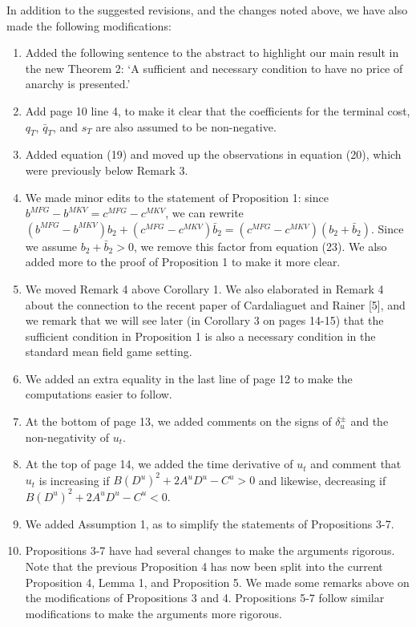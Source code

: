\documentclass[11pt]{article}
\begin{document}
\hspace{-7mm} In addition to the suggested revisions, and the changes noted above, we have also made the following modifications:
\begin{enumerate}
	\item Added the following sentence to the abstract to highlight our main result in the new Theorem 2: `A sufficient and necessary condition to have no price of anarchy is presented.'
	\item Add page 10 line 4, to make it clear that the coefficients for the terminal cost, $q_T$, $\bar{q}_T$, and $s_T$ are also assumed to be non-negative.
	\item Added equation (19) and moved up the observations in equation (20), which were previously below Remark 3.
	\item We made minor edits to the statement of Proposition 1: since $b^{MFG}-b^{MKV}=c^{MFG}-c^{MKV}$, we can rewrite $(b^{MFG}-b^{MKV})b_2+(c^{MFG}-c^{MKV})\bar{b}_2=(c^{MFG}-c^{MKV})(b_2+\bar{b}_2)$. Since we assume $b_2+\bar{b}_2>0$, we remove this factor from equation (23). We also added more to the proof of Proposition 1 to make it more clear.
	\item We moved Remark 4 above Corollary 1. We also elaborated in Remark 4 about the connection to the recent paper of Cardaliaguet and Rainer [5], and we remark that we will see later (in Corollary 3 on pages 14-15) that the sufficient condition in Proposition 1 is also a necessary condition in the standard mean field game setting.
	\item We added an extra equality in the last line of page 12 to make the computations easier to follow.
	\item At the bottom of page 13, we added comments on the signs of $\delta^{\pm}_u$ and the non-negativity of $u_t$.
	\item At the top of page 14, we added the time derivative of $u_t$ and comment that $u_t$ is increasing if $B(D^u)^2+2A^uD^u-C^u>0$ and likewise, decreasing if $B(D^u)^2+2A^uD^u-C^u<0$.
	\item We added Assumption 1, as to simplify the statements of Propositions 3-7.
	\item Propositions 3-7 have had several changes to make the arguments rigorous. Note that the previous Proposition 4 has now been split into the current Proposition 4, Lemma 1, and Proposition 5. We made some remarks above on the modifications of Propositions 3 and 4. Propositions 5-7 follow similar modifications to make the arguments more rigorous.

\end{enumerate}
\end{document}
